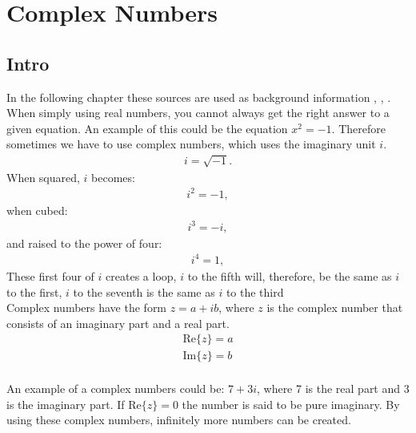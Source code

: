 \chapter{Complex Numbers}

\section{Intro}
In the following chapter these sources are used as background information \cite{complexpaul}, \cite{complexpurple}, \cite{complexnotebook}.
When simply using real numbers, you cannot always get the right answer to a given equation. An example of this could be the equation $x^2=-1$. Therefore sometimes we have to use complex numbers, which uses the imaginary unit $i$.
\begin{align*}
i=\sqrt{-1}.
\end{align*}
When squared, $i$ becomes:
\begin{align*}
i^2=-1,
\end{align*}
when cubed:
\begin{align*}
i^3=-i,
\end{align*}
and raised to the power of four:
\begin{align*}
i^4=1,
\end{align*}
These first four of $i$ creates a loop, $i$ to the fifth will, therefore, be the same as $i$ to the first, $i$ to the seventh is the same as $i$ to the third \\
Complex numbers have the form $z=a+ib$, where $z$ is the complex number that consists of an imaginary part and a real part. 
\begin{align*}
\text{Re}\{z\}=a
\\
\text{Im}\{z\}=b
\end{align*}
\\
An example of a complex numbers could be: $7+3i$, where 7 is the real part and 3 is the imaginary part. If $\text{Re}\{z\}=0$ the number is said to be pure imaginary. 
By using these complex numbers, infinitely more numbers can be created. 
